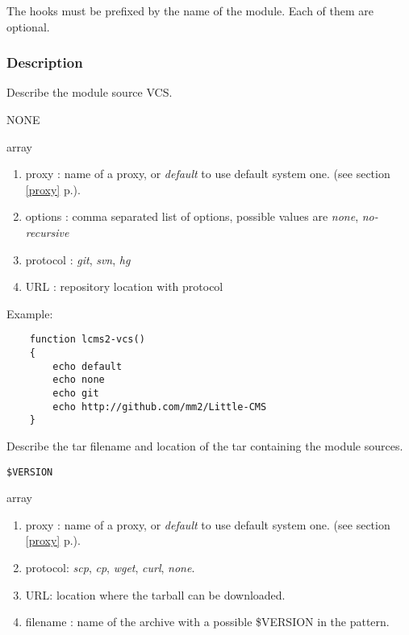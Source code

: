 \documentclass[a4paper,12pt,twoside]{article}
\newcommand{\code}[1]{\texttt{#1}}
\renewcommand{\emph}[1]{\textit{#1}}
\newcommand{\seeref}[1]{see section \ref{#1} p.\pageref{#1}}
\begin{document}
The hooks must be prefixed by the name of the module. Each of them are optional.

\subsubsection{Description}

\begin{description}[font=\large\texttt]

	\item[<module>-vcs] Describe the module source VCS.
	\begin{description}[font=\textit,style=standard]
		\item[parameter] \tabto{2cm} NONE
		\item[return] \tabto{2cm} array
		\begin{enumerate}
			\item proxy : name of a proxy, or \emph{default} to use default system one. (\seeref{proxy}).
			\item options : comma separated list of options, possible values are \emph{none}, \emph{no-recursive}
			\item protocol : \emph{git}, \emph{svn}, \emph{hg}
			\item URL : repository location with protocol
		\end{enumerate}
	\end{description}

	Example:
	\begin{lstlisting}
	function lcms2-vcs()
	{
		echo default
		echo none
		echo git
		echo http://github.com/mm2/Little-CMS
	}
	\end{lstlisting}

	\item[<module>-tar] Describe the tar filename and location of the tar containing the module sources.
	\begin{description}[font=\textit,style=standard]
		\item[parameter] \tabto{2cm} \code{\$VERSION}
		\item[return] \tabto{2cm} array
		\begin{enumerate}
		\item proxy : name of a proxy, or \emph{default} to use default system one. (\seeref{proxy}).
		\item protocol: \emph{scp}, \emph{cp}, \emph{wget}, \emph{curl}, \emph{none}.
		\item URL: location where the tarball can be downloaded.
		\item filename : name of the archive with a possible \$VERSION in the pattern.
		\end{enumerate}
	\end{description}


\end{description}
\end{document}
